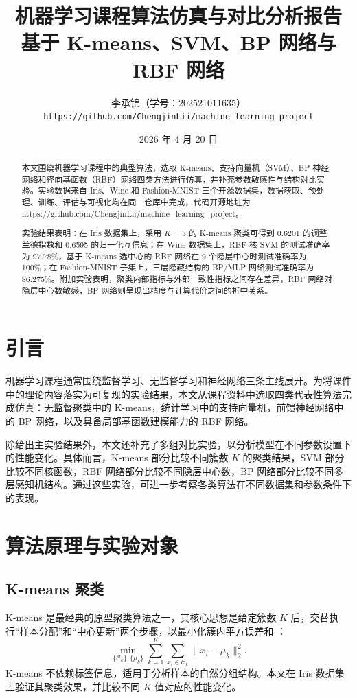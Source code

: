 \documentclass[UTF8]{ctexart}
\title{机器学习课程算法仿真与对比分析报告\\基于 K-means、SVM、BP 网络与 RBF 网络}
\author{
李承锦（学号：202521011635） \\
\texttt{https://github.com/ChengjinLii/machine\_learning\_project}
}
\date{2026 年 4 月 20 日}
\begin{document}
\maketitle

\begin{abstract}
本文围绕机器学习课程中的典型算法，选取 K-means、支持向量机（SVM）、BP 神经网络和径向基函数（RBF）网络四类方法进行仿真，并补充参数敏感性与结构对比实验。实验数据来自 Iris、Wine 和 Fashion-MNIST 三个开源数据集，数据获取、预处理、训练、评估与可视化均在同一仓库中完成，代码开源地址为 \url{https://github.com/ChengjinLii/machine_learning_project}。

实验结果表明：在 Iris 数据集上，采用 $K=3$ 的 K-means 聚类可得到 0.6201 的调整兰德指数和 0.6595 的归一化互信息；在 Wine 数据集上，RBF 核 SVM 的测试准确率为 97.78\%，基于 K-means 选中心的 RBF 网络在 9 个隐层中心时测试准确率为 100\%；在 Fashion-MNIST 子集上，三层隐藏结构的 BP/MLP 网络测试准确率为 86.275\%。附加实验表明，聚类内部指标与外部一致性指标之间存在差异，RBF 网络对隐层中心数敏感，BP 网络则呈现出精度与计算代价之间的折中关系。
\end{abstract}


\section{引言}
机器学习课程通常围绕监督学习、无监督学习和神经网络三条主线展开。为将课件中的理论内容落实为可复现的实验结果，本文从课程资料中选取四类代表性算法完成仿真：无监督聚类中的 K-means，统计学习中的支持向量机，前馈神经网络中的 BP 网络，以及具备局部基函数建模能力的 RBF 网络。

除给出主实验结果外，本文还补充了多组对比实验，以分析模型在不同参数设置下的性能变化。具体而言，K-means 部分比较不同簇数 $K$ 的聚类结果，SVM 部分比较不同核函数，RBF 网络部分比较不同隐层中心数，BP 网络部分比较不同多层感知机结构。通过这些实验，可进一步考察各类算法在不同数据集和参数条件下的表现。

\section{算法原理与实验对象}

\subsection{K-means 聚类}
K-means 是最经典的原型聚类算法之一，其核心思想是给定簇数 $K$ 后，交替执行“样本分配”和“中心更新”两个步骤，以最小化簇内平方误差和 \cite{macqueen1967}：
\begin{equation}
\min_{\{\mathcal{C}_k\}, \{\mu_k\}}
\sum_{k=1}^{K} \sum_{x_i \in \mathcal{C}_k} \|x_i - \mu_k\|_2^2 .
\end{equation}
K-means 不依赖标签信息，适用于分析样本的自然分组结构。本文在 Iris 数据集上验证其聚类效果，并比较不同 $K$ 值对应的性能变化。
\end{document}
